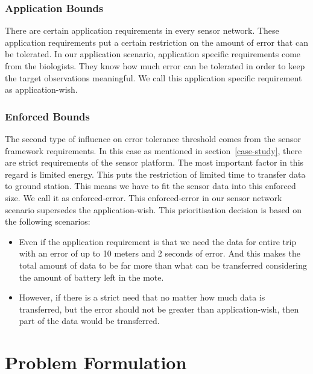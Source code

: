 \documentclass[conference]{IEEEtran}
\begin{document}
\subsubsection{Application Bounds}
There are certain application requirements in every sensor network. These application requirements 
put a certain restriction on the amount of error that can be tolerated. In our application scenario, 
application specific requirements come from the biologists. They know how much error can be tolerated 
in order to keep the target observations meaningful. We call this application specific requirement as 
application-wish.

\subsubsection{Enforced Bounds}
The second type of influence on error tolerance threshold comes from the sensor framework requirements. 
In this case as mentioned in section~\ref{case-study}, there are strict requirements of the sensor platform. 
The most important factor in this regard is limited energy. This puts the restriction of limited time to 
transfer data to ground station. This means we have to fit the sensor data into this enforced size. We 
call it as enforced-error. This enforced-error in our sensor network scenario supersedes the application-wish. 
This prioritisation decision is based on the following scenarios:

\begin{itemize}
\item Even if the application requirement is that we need the data for entire trip with an error of 
up to 10 meters and 2 seconds of error. And this makes the total amount of data to be far more than 
what can be transferred considering the amount of battery left in the mote.
\item However, if there is a strict need that no matter how much data is transferred, but the error 
should not be greater than application-wish, then part of the data would be transferred. 
\end{itemize}

\section{Problem Formulation}\label{sec:problem}
\end{document}
